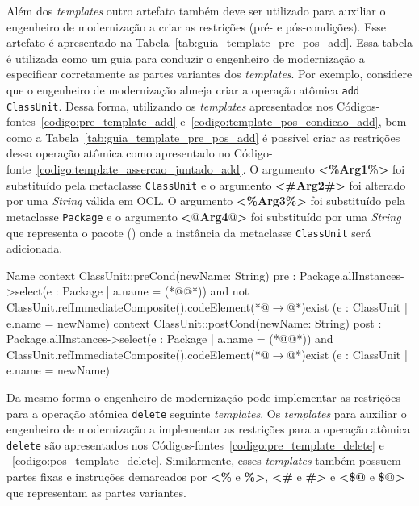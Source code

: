 Além dos \textit{templates} outro artefato também deve ser utilizado para auxiliar o engenheiro de modernização a criar as restrições (pré- e pós-condições). Esse artefato é apresentado na Tabela~\ref{tab:guia_template_pre_pos_add}. Essa tabela é utilizada como um guia para conduzir o engenheiro de modernização a especificar corretamente as partes variantes dos \textit{templates}. Por exemplo, considere que o engenheiro de modernização almeja criar a operação atômica \texttt{add} \texttt{ClassUnit}. Dessa forma, utilizando os \textit{templates} apresentados nos Códigos-fontes~\ref{codigo:pre_template_add} e~\ref{codigo:template_pos_condicao_add}, bem como a Tabela~\ref{tab:guia_template_pre_pos_add} é possível criar as restrições dessa operação atômica como apresentado no Código-fonte~\ref{codigo:template_assercao_juntado_add}. O argumento \textbf{<\%Arg1\%>} foi substituído pela metaclasse \texttt{ClassUnit} e o argumento \textbf{<\#Arg2\#>} foi alterado por uma \textit{String} válida em OCL. O argumento \textbf{<\%Arg3\%>} foi substituído pela metaclasse \texttt{Package} e o  argumento \textbf{<$@$Arg4$@$>} foi  substituído por uma \textit{String} que representa o pacote () onde a instância da metaclasse \texttt{ClassUnit} será adicionada.

\begin{codigo}[caption={[Asserções em OCL para realizar a operação atômica \texttt{add}.] Asserções em OCL para realizar a operação atômica \texttt{add}.},escapeinside={(*@}{@*)}, basicstyle=\footnotesize, label={codigo:template_assercao_juntado_add}, language=OCL]{Name}
context ClassUnit::preCond(newName: String)
pre : Package.allInstances->select(e : Package | a.name = (*@@*)) and not ClassUnit.refImmediateComposite().codeElement(*@$\rightarrow$@*)exist (e : ClassUnit | e.name = newName)
context ClassUnit::postCond(newName: String)
post : Package.allInstances->select(e : Package | a.name = (*@@*)) and ClassUnit.refImmediateComposite().codeElement(*@$\rightarrow$@*)exist (e : ClassUnit | e.name = newName)
\end{codigo}

Da mesmo forma o engenheiro de modernização pode implementar as restrições para a operação atômica \texttt{delete} seguinte \textit{templates}. Os \textit{templates} para auxiliar o engenheiro de modernização a implementar as restrições para a operação atômica \texttt{delete} são apresentados nos Códigos-fontes~\ref{codigo:pre_template_delete} e ~\ref{codigo:pos_template_delete}. Similarmente, esses \textit{templates} também possuem partes fixas e instruções demarcados por \textbf{<\%} e \textbf{\%>}, \textbf{<\#} e \textbf{\#>} e \textbf{<\$@} e \textbf{\$@>} que representam as partes variantes.

